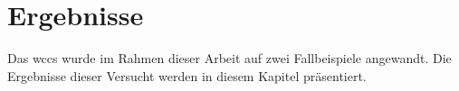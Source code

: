 \chapter{Ergebnisse}
    \label{chapter:Findings}
    Das \gls{wccs} wurde im Rahmen dieser Arbeit auf zwei Fallbeispiele angewandt.
    Die Ergebnisse dieser Versucht werden in diesem Kapitel präsentiert.
   
    
    
    
